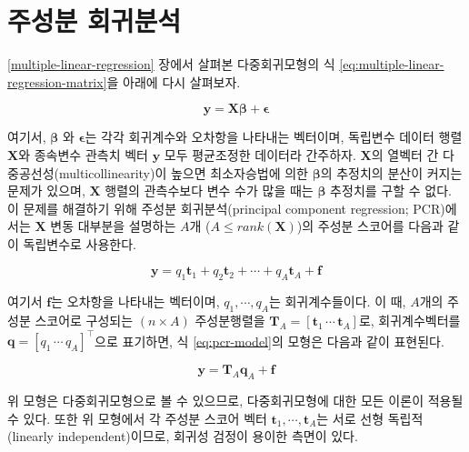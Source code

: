 \documentclass[
]{book}
\begin{document}
\hypertarget{pca-regression}{%
\section{주성분 회귀분석}\label{pca-regression}}

\ref{multiple-linear-regression} 장에서 살펴본 다중회귀모형의 식 \eqref{eq:multiple-linear-regression-matrix}을 아래에 다시 살펴보자.

\begin{equation}
\mathbf{y} = \mathbf{X} \boldsymbol{\beta} + \boldsymbol{\epsilon} \label{eq:pca-multiple-linear-regression-matrix}
\end{equation}

여기서, \(\boldsymbol{\beta}\) 와 \(\boldsymbol{\epsilon}\)는 각각 회귀계수와 오차항을 나타내는 벡터이며, 독립변수 데이터 행렬 \(\mathbf{X}\)와 종속변수 관측치 벡터 \(\mathbf{y}\) 모두 평균조정한 데이터라 간주하자. \(\mathbf{X}\)의 열벡터 간 다중공선성(multicollinearity)이 높으면 최소자승법에 의한 \(\boldsymbol{\beta}\)의 추정치의 분산이 커지는 문제가 있으며, \(\mathbf{X}\) 행렬의 관측수보다 변수 수가 많을 때는 \(\boldsymbol{\beta}\) 추정치를 구할 수 없다. 이 문제를 해결하기 위해 주성분 회귀분석(principal component regression; PCR)에서는 \(\mathbf{X}\) 변동 대부분을 설명하는 \(A\)개 (\(A \leq rank(\mathbf{X})\))의 주성분 스코어를 다음과 같이 독립변수로 사용한다.

\begin{equation}
\mathbf{y} = q_1 \mathbf{t}_1 + q_2 \mathbf{t}_2 + \cdots + q_A \mathbf{t}_A + \mathbf{f} \label{eq:pcr-model}
\end{equation}

여기서 \(\mathbf{f}\)는 오차항을 나타내는 벡터이며, \(q_1, \cdots, q_A\)는 회귀계수들이다. 이 때, \(A\)개의 주성분 스코어로 구성되는 \((n \times A)\) 주성분행렬을 \(\mathbf{T}_A = [\mathbf{t}_1 \, \cdots \, \mathbf{t}_A]\)로, 회귀계수벡터를 \(\mathbf{q} = [q_1 \, \cdots \, q_A]^\top\)으로 표기하면, 식 \eqref{eq:pcr-model}의 모형은 다음과 같이 표현된다.

\begin{equation}
\mathbf{y} = \mathbf{T}_A \mathbf{q}_A + \mathbf{f} \label{eq:pcr-matrix-model}
\end{equation}

위 모형은 다중회귀모형으로 볼 수 있으므로, 다중회귀모형에 대한 모든 이론이 적용될 수 있다. 또한 위 모형에서 각 주성분 스코어 벡터 \(\mathbf{t}_1, \cdots, \mathbf{t}_A\)는 서로 선형 독립적(linearly independent)이므로, 회귀성 검정이 용이한 측면이 있다.
\end{document}
